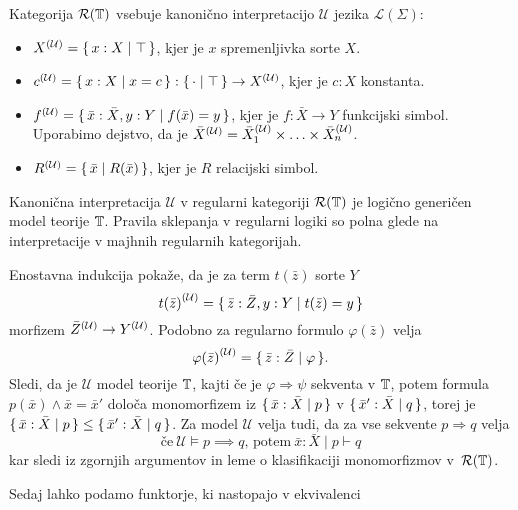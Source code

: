 \documentclass[../kategoricna_logika.tex]{subfiles}
\begin{document}
\begin{definicija}
  Kategorija $\mathcal{R}(\T)$ vsebuje kanonično interpretacijo
  $\mathcal{U}$ jezika $\mathcal{L}(\Sigma)$:
  \begin{itemize}
  \item $\interp[\mathcal{U}]{X} = \set{x:X \mid  \top}$, kjer je
    $x$ spremenljivka sorte $X$.
  \item
    $\interp[\mathcal{U}]{c} = \set{x:X \mid  x = c} :
    \set{\cdot \mid  \top} \to \interp[\mathcal{U}]{X}$, kjer je
    $c:X$ konstanta.
  \item
    $\interp[\mathcal{U}]{f} = \set{\bar{x}:\bar{X},y:Y \mid  f(\bar{x})
      = y}$, kjer je $f : \bar{X}\to Y$ funkcijski simbol. Uporabimo
    dejstvo, da je
    $\bar{X}^{(\mathcal{U})} = \interp[\mathcal{U}]{\bar{X}_1} \times
    \ldots \times \interp[\mathcal{U}]{\bar{X}_n}$.
  \item
    $\interp[\mathcal{U}]{R} = \set{\bar{x} \mid  R(\bar{x})}$,
    kjer je $R$ relacijski simbol.
  \end{itemize}
\end{definicija}
\begin{izrek}\label{izrek:logicno-genericen-model-regularne-logike}
  Kanonična interpretacija $\mathcal{U}$ v regularni kategoriji
  $\mathcal{R}(\T)$ je logično generičen model teorije $\T$. Pravila
  sklepanja v regularni logiki so polna glede na interpretacije v
  majhnih regularnih kategorijah.
\end{izrek}
\begin{dokaz}
  Enostavna indukcija pokaže, da je za term $t(\bar{z})$ sorte $Y$
$$\caninterp{t(\bar{z})} = \set{\bar{z}:\bar{Z},y:Y \mid  t(\bar{z}) = y}$$
morfizem $\caninterp{\bar{Z}} \to \caninterp{Y}$.
Podobno za regularno
formulo $\varphi(\bar{z})$ velja
$$\caninterp{\varphi(\bar{z})} = \set{\bar{z}:\bar{Z} \mid  \varphi}.$$
Sledi, da je $\mathcal{U}$ model teorije $\T$, kajti če je
$\varphi \Rightarrow \psi$ sekventa v $\T$, potem formula
$p(\bar{x}) \wedge \bar{x}= \bar{x}'$ določa monomorfizem iz
$\set{\bar{x}:\bar{X} \mid  p}$ v $\set{\bar{x}':\bar{X} \mid  q}$, torej
je $\set{\bar{x}:\bar{X} \mid  p} \leq \set{\bar{x}':{\bar{X}} \mid  q}$.
Za model $\mathcal{U}$ velja tudi, da za vse sekvente
$p \Rightarrow q$ velja
$$\text{če} \ \mathcal{U} \models p \implies q \text{, potem} \ \bar{x}:\bar{X} \mid p \vdash q$$
kar sledi iz zgornjih argumentov in leme o klasifikaciji monomorfizmov
v~$\mathcal{R}(\T)$.
\end{dokaz}
Sedaj lahko podamo funktorje, ki nastopajo v ekvivalenci
\end{document}
